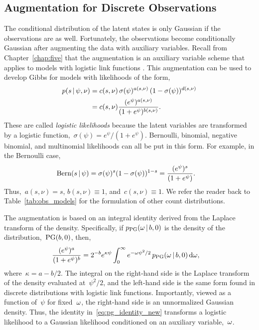 \subsection{\polyagamma Augmentation for Discrete Observations}
The conditional distribution of the latent states is only Gaussian
if the observations are as well. Fortunately, the observations become
conditionally Gaussian after augmenting the
data with \polyagamma auxiliary variables. 
Recall from Chapter~\ref{chap:five} that the \polyagamma augmentation
is an auxiliary variable scheme that applies to models with logistic
link functions \citep{polson2013bayesian}.  This augmentation can be
used to develop Gibbs for models with likelihoods of the form,
\begin{align*}
  \nonumber  p(s \,|\, \psi, \nu)
  &= c(s, \nu) \, \sigma(\psi)^{a(s, \nu)} \,
  (1-\sigma(\psi))^{d(s, \nu)} \\
  &= c(s, \nu)
  \frac{(e^{\psi})^{a(s, \nu)}}
       {(1+e^{\psi})^{b(s, \nu)}}.
\end{align*}
These are called \emph{logistic likelihoods} because the latent
variables are transformed by a logistic
function,~${\sigma(\psi)=e^\psi /(1+e^\psi)}$.  Bernoulli, binomial,
negative binomial, and multinomial likelihoods can all be put in this
form.  For example, in the Bernoulli
case,
\begin{align*}
  \mathrm{Bern}(s \,|\, \psi) 
  &= \sigma(\psi)^{s}
    (1-\sigma(\psi))^{1-s}
  = \frac{(e^{\psi})^{s}}
       {(1+e^{\psi})}.
\end{align*}
Thus,~${a(s, \nu) = s}$,
${b(s,\nu) \equiv 1}$, and~${c(s, \nu) \equiv 1}$.
We refer the reader back to Table~\ref{tab:obs_models} for the formulation of
other count distributions.

The augmentation is based on an integral identity
derived from the Laplace transform of the \polyagamma density.
Specifically, if $p_{\mathrm{PG}}({\omega}\,|\, b, 0)$ is the
density of the \polyagamma distribution,~${\mathrm{PG}(b, 0)}$,
then,
\begin{align}
  \frac{(e^{\psi})^a}{(1+e^{\psi})^b}
  &= 2^{-b} e^{\kappa \psi}
  \int_{0}^{\infty} e^{-{\omega} \psi^2 /2} \,
  p_{\mathrm{PG}}({\omega} \,|\, b, 0) \, \mathrm{d}{\omega},
\label{eq:pg_identity_new}
\end{align}
where~${\kappa=a-b/2}$. The integral on the right-hand side is the
Laplace transform of the \polyagamma density evaluated at~$\psi^2/2$,
and the left-hand side is the same form found in discrete
distributions with logistic link functions.  Importantly, viewed as a
function of~$\psi$ for fixed~${\omega}$, the right-hand side is an
unnormalized Gaussian density.  Thus, the identity
in~\eqref{eq:pg_identity_new} transforms a logistic likelihood to a
Gaussian likelihood conditioned on an auxiliary variable,~${\omega}$.

